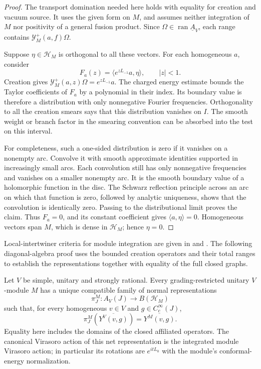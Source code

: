 \begin{proof}
The transport domination needed here holds with equality for creation
and vacuum source.  It uses the given form on $M$, and assumes neither
integration of $M$ nor positivity of a general fusion product.
Since $\Omega\in\operatorname{ran}\underline A_V$, each range contains
$\mathcal Y_M^+(a,f)\Omega$.

Suppose $\eta\in\mathcal H_M$ is orthogonal to all these vectors.
For each homogeneous $a$, consider
\[
 F_a(z)=\langle e^{zL_{-1}}a,\eta\rangle,
 \qquad |z|<1.
\]
Creation gives
$\mathcal Y_M^+(a,z)\Omega=e^{zL_{-1}}a$.
The charged energy estimate bounds the Taylor coefficients of $F_a$
by a polynomial in their index.  Its boundary value is therefore a
distribution with only nonnegative Fourier frequencies.  Orthogonality
to all the creation smears says that this distribution vanishes on
$I$.  The smooth weight or branch factor in the smearing convention
can be absorbed into the test on this interval.

For completeness, such a one-sided distribution is zero if it vanishes
on a nonempty arc.  Convolve it with smooth approximate identities
supported in increasingly small arcs.  Each convolution still has
only nonnegative frequencies and vanishes on a smaller nonempty arc.
It is the smooth boundary value of a holomorphic function in the disc.
The Schwarz reflection principle across an arc on which that function
is zero, followed by analytic uniqueness, shows that the convolution
is identically zero.  Passing to the distributional limit proves the
claim.  Thus $F_a=0$, and its constant coefficient gives
$\langle a,\eta\rangle=0$.  Homogeneous vectors span $M$, which is
dense in $\mathcal H_M$; hence $\eta=0$.
\end{proof}

Local-intertwiner criteria for module integration are given in
\cite[Proposition~4.7]{GuiUnitaryII} and
\cite[Lemma~4.27]{GuiExtensions}. The following diagonal-algebra proof
uses the bounded creation operators and their total ranges to establish
the representations together with equality of the full closed graphs.

\begin{theorem}
\label{thm:integration}
Let $V$ be simple, unitary and strongly rational.  Every
grading-restricted unitary $V$-module $M$ has a unique compatible
family of normal representations
\[
 \pi_J^M:A_V(J)\longrightarrow B(\mathcal H_M)
\]
such that, for every homogeneous $v\in V$ and
$g\in C_c^\infty(J)$,
\begin{equation}
 \pi_J^M\!\left(\overline{Y^V(v,g)}\right)
       =\overline{Y^M(v,g)}.
 \label{eq:exact-cwx-smear}
\end{equation}
Equality here includes the domains of the closed affiliated operators.
The canonical Virasoro action of this net representation is the
integrated module Virasoro action; in particular its rotations are
$e^{itL_0}$ with the module's conformal-energy normalization.
\end{theorem}

